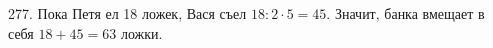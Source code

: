 277. Пока Петя ел 18 ложек, Вася съел $18:2\cdot5=45.$ Значит, банка вмещает в себя $18+45=63$ ложки.\\
